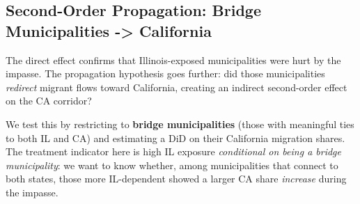 \documentclass[
  11pt,
  letterpaper,
  DIV=11,
  numbers=noendperiod]{scrartcl}
\begin{document}
\subsection{Second-Order Propagation: Bridge Municipalities
-\textgreater{}
California}\label{second-order-propagation-bridge-municipalities---california}

The direct effect confirms that Illinois-exposed municipalities were
hurt by the impasse. The propagation hypothesis goes further: did those
municipalities \emph{redirect} migrant flows toward California, creating
an indirect second-order effect on the CA corridor?

We test this by restricting to \textbf{bridge municipalities} (those
with meaningful ties to both IL and CA) and estimating a DiD on their
California migration shares. The treatment indicator here is high IL
exposure \emph{conditional on being a bridge municipality}: we want to
know whether, among municipalities that connect to both states, those
more IL-dependent showed a larger CA share \emph{increase} during the
impasse.
\end{document}
